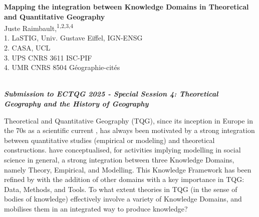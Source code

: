 \documentclass[11pt]{article}
\renewcommand{\title}[1]{{\noindent\large\bfseries#1\medskip\\}}
\renewcommand{\author}[2]{{\noindent #1 \medskip\\ \small #2 \medskip\\}}
\begin{document}
\title{Mapping the integration between Knowledge Domains in Theoretical and Quantitative Geography}
\author{
Juste Raimbault,\textsuperscript{1,2,3,4}
}
{
1. LaSTIG, Univ. Gustave Eiffel, IGN-ENSG\\
2. CASA, UCL\\
3. UPS CNRS 3611 ISC-PIF\\
4. UMR CNRS 8504 G{\'e}ographie-cit{\'e}s\\
}









\vspace{-1cm}
\noindent
\textit{\textbf{Submission to ECTQG 2025 - Special Session 4: Theoretical Geography and the History of Geography}}

\vspace{1cm}

Theoretical and Quantitative Geography (TQG), since its inception in Europe in the 70s as a scientific current \cite{cuyala2015affirmation}, has always been motivated by a strong integration between quantitative studies (empirical or modeling) and theoretical constructions. \cite{livet2010ontology} have conceptualised, for activities implying modelling in social science in general, a strong integration between three Knowledge Domains, namely Theory, Empirical, and Modelling. This Knowledge Framework has been refined by \cite{raimbault2017applied} with the addition of other domains with a key importance in TQG: Data, Methods, and Tools. To what extent theories in TQG (in the sense of bodies of knowledge) effectively involve a variety of Knowledge Domains, and mobilises them in an integrated way to produce knowledge?
\end{document}
